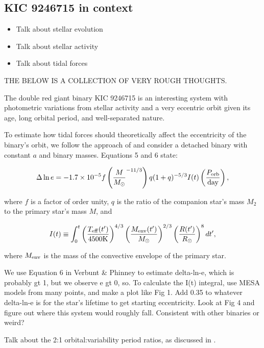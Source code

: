 \subsection{KIC 9246715 in context}\label{context}
\begin{itemize}
\item Talk about stellar evolution
\item Talk about stellar activity
\item Talk about tidal forces
\end{itemize}

THE BELOW IS A COLLECTION OF VERY ROUGH THOUGHTS.

The double red giant binary KIC 9246715 is an interesting system with photometric variations from stellar activity and a very eccentric orbit given its age, long orbital period, and well-separated nature.

To estimate how tidal forces should theoretically affect the eccentricity of the binary's orbit, we follow the approach of \citet{ver95} and consider a detached binary with constant $a$ and binary masses. Equations 5 and 6 \citep{ver95} state:

\begin{equation}\label{tide1}
\Delta \ln e = -1.7 \times 10^{-5} f \left( \frac{M}{M_{\odot}}^{-11/3} \right) q(1+q)^{-5/3} I(t) \left( \frac{P_{\rm{orb}}}{\rm{day}} \right),
\end{equation}

where $f$ is a factor of order unity, $q$ is the ratio of the companion star's mass $M_2$ to the primary star's mass $M$, and

\begin{equation}
I(t) \equiv \int_0^t \left( \frac{T_{\rm{eff}}(t')}{4500 \rm{K}} \right)^{4/3} \left( \frac{M_{\rm{env}}(t')}{M_{\odot}} \right)^{2/3} \left( \frac{R(t')}{R_{\odot}} \right)^8 dt',
\end{equation}

where $M_{\rm{env}}$ is the mass of the convective envelope of the primary star.

We use Equation 6 in  Verbunt & Phinney to estimate delta-ln-e, which is probably gt 1, but we observe e gt 0, so.
To calculate the I(t) integral, use MESA models from many points, and make a plot like Fig 1.
Add 0.35 to whatever delta-ln-e is for the star's lifetime to get starting eccentricity.
Look at Fig 4 and figure out where this system would roughly fall. Consistent with other binaries or weird?

Talk about the 2:1 orbital:variability period ratios, as discussed in \citet{gau14}.

